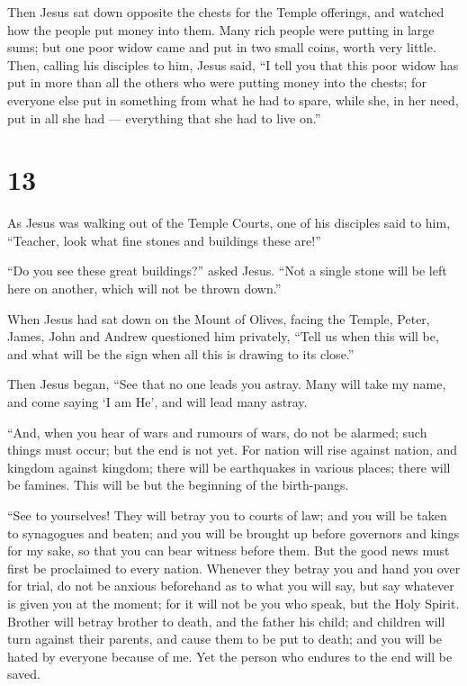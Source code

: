  Then Jesus sat down opposite the chests for the Temple
offerings, and watched how the people put money into them. Many rich
people were putting in large sums;  but one poor widow came
and put in two small coins, worth very little.  Then,
calling his disciples to him, Jesus said, ``I tell you that this poor
widow has put in more than all the others who were putting money into
the chests;  for everyone else put in something from what
he had to spare, while she, in her need, put in all she had ---
everything that she had to live on.''

\hypertarget{section-12}{%
\section{13}\label{section-12}}

 As Jesus was walking out of the Temple Courts, one of his
disciples said to him, ``Teacher, look what fine stones and buildings
these are!''

 ``Do you see these great buildings?'' asked Jesus. ``Not a
single stone will be left here on another, which will not be thrown
down.''

 When Jesus had sat down on the Mount of Olives, facing the
Temple, Peter, James, John and Andrew questioned him privately,
 ``Tell us when this will be, and what will be the sign when
all this is drawing to its close.''

 Then Jesus began, ``See that no one leads you astray.
 Many will take my name, and come saying `I am He', and will
lead many astray.

 ``And, when you hear of wars and rumours of wars, do not be
alarmed; such things must occur; but the end is not yet. 
For nation will rise against nation, and kingdom against kingdom; there
will be earthquakes in various places; there will be famines. This will
be but the beginning of the birth-pangs.

 ``See to yourselves! They will betray you to courts of law;
and you will be taken to synagogues and beaten; and you will be brought
up before governors and kings for my sake, so that you can bear witness
before them.  But the good news must first be proclaimed to
every nation.  Whenever they betray you and hand you over
for trial, do not be anxious beforehand as to what you will say, but say
whatever is given you at the moment; for it will not be you who speak,
but the Holy Spirit.  Brother will betray brother to death,
and the father his child; and children will turn against their parents,
and cause them to be put to death;  and you will be hated
by everyone because of me. Yet the person who endures to the end will be
saved.

